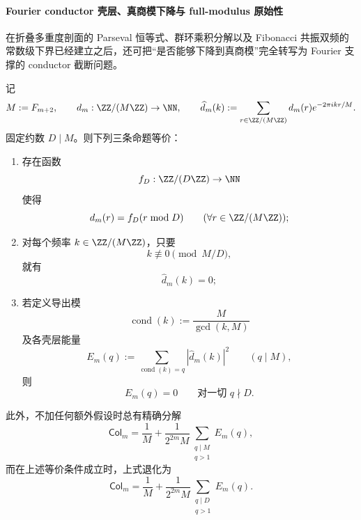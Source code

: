 \paragraph{Fourier conductor 壳层、真商模下降与 full-modulus 原始性}
在折叠多重度剖面的 Parseval 恒等式、群环乘积分解以及 Fibonacci 共振双频的常数级下界已经建立之后，还可把“是否能够下降到真商模”完全转写为 Fourier 支撑的 conductor 截断问题。

\begin{theorem}\label{thm:xi-fold-multiplicity-quotient-descent-fourier-conductor}
记
\[
M:=F_{m+2},
\qquad
d_m:\ZZ/(M\ZZ)\to\NN,
\qquad
\widehat d_m(k):=\sum_{r\in\ZZ/(M\ZZ)}d_m(r)e^{-2\pi i kr/M}.
\]
固定约数 \(D\mid M\)。则下列三条命题等价：
\begin{enumerate}
  \item 存在函数
  \[
  f_D:\ZZ/(D\ZZ)\to\NN
  \]
  使得
  \[
  d_m(r)=f_D(r\bmod D)
  \qquad
  (\forall r\in\ZZ/(M\ZZ));
  \]
  \item 对每个频率 \(k\in\ZZ/(M\ZZ)\)，只要
  \[
  k\not\equiv 0\pmod{M/D},
  \]
  就有
  \[
  \widehat d_m(k)=0;
  \]
  \item 若定义导出模
  \[
  \operatorname{cond}(k):=\frac{M}{\gcd(k,M)}
  \]
  及各壳层能量
  \[
  E_m(q):=\sum_{\operatorname{cond}(k)=q}|\widehat d_m(k)|^2
  \qquad (q\mid M),
  \]
  则
  \[
  E_m(q)=0
  \qquad
  \text{对一切 }q\nmid D.
  \]
\end{enumerate}
此外，不加任何额外假设时总有精确分解
\[
\mathsf{Col}_m
=
\frac1M+\frac{1}{2^{2m}M}\sum_{\substack{q\mid M\\ q>1}}E_m(q),
\]
而在上述等价条件成立时，上式退化为
\[
\mathsf{Col}_m
=
\frac1M+\frac{1}{2^{2m}M}\sum_{\substack{q\mid D\\ q>1}}E_m(q).
\]
\end{theorem}

